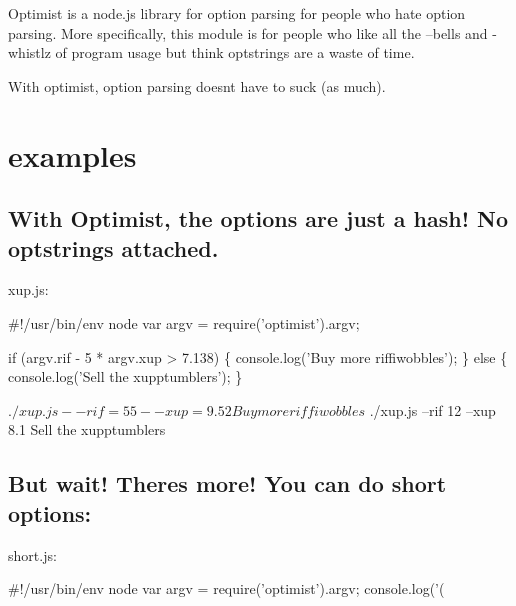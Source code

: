 Optimist is a node.\+js library for option parsing for people who hate option parsing. More specifically, this module is for people who like all the --bells and -\/whistlz of program usage but think optstrings are a waste of time.

With optimist, option parsing doesn\textquotesingle{}t have to suck (as much).

\href{http://travis-ci.org/substack/node-optimist}{\tt }

\section*{examples }

\subsection*{With Optimist, the options are just a hash! No optstrings attached. }

xup.\+js\+:


\begin{DoxyCode}
#!/usr/bin/env node
var argv = require('optimist').argv;

if (argv.rif - 5 * argv.xup > 7.138) \{
    console.log('Buy more riffiwobbles');
\}
else \{
    console.log('Sell the xupptumblers');
\}
\end{DoxyCode}




 \begin{DoxyVerb}$ ./xup.js --rif=55 --xup=9.52
Buy more riffiwobbles

$ ./xup.js --rif 12 --xup 8.1
Sell the xupptumblers
\end{DoxyVerb}




\subsection*{But wait! There\textquotesingle{}s more! You can do short options\+: }

short.\+js\+:


\begin{DoxyCode}
#!/usr/bin/env node
var argv = require('optimist').argv;
console.log('(%
\end{DoxyCode}






